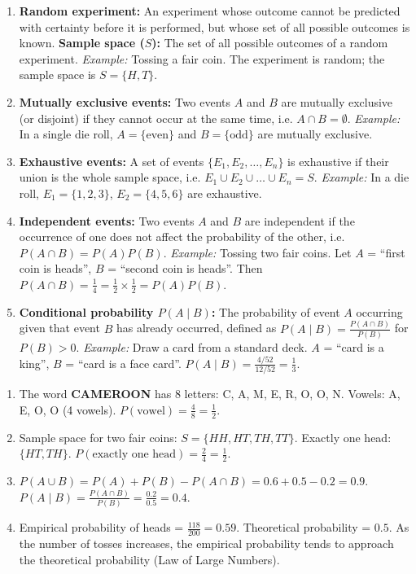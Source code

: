 \documentclass[11pt]{article}
\begin{document}
\begin{corrige}
\begin{enumerate}
\item \textbf{Random experiment:} An experiment whose outcome cannot be predicted with certainty before it is performed, but whose set of all possible outcomes is known. \textbf{Sample space ($S$):} The set of all possible outcomes of a random experiment. \emph{Example:} Tossing a fair coin. The experiment is random; the sample space is $S = \{H, T\}$.
\item \textbf{Mutually exclusive events:} Two events $A$ and $B$ are mutually exclusive (or disjoint) if they cannot occur at the same time, i.e. $A \cap B = \emptyset$. \emph{Example:} In a single die roll, $A = \{\text{even}\}$ and $B = \{\text{odd}\}$ are mutually exclusive.
\item \textbf{Exhaustive events:} A set of events $\{E_1, E_2, \dots, E_n\}$ is exhaustive if their union is the whole sample space, i.e. $E_1 \cup E_2 \cup \dots \cup E_n = S$. \emph{Example:} In a die roll, $E_1 = \{1,2,3\}$, $E_2 = \{4,5,6\}$ are exhaustive.
\item \textbf{Independent events:} Two events $A$ and $B$ are independent if the occurrence of one does not affect the probability of the other, i.e. $P(A \cap B) = P(A)P(B)$. \emph{Example:} Tossing two fair coins. Let $A$ = ``first coin is heads'', $B$ = ``second coin is heads''. Then $P(A \cap B) = \frac{1}{4} = \frac{1}{2} \times \frac{1}{2} = P(A)P(B)$.
\item \textbf{Conditional probability $P(A \mid B)$:} The probability of event $A$ occurring given that event $B$ has already occurred, defined as $P(A \mid B) = \frac{P(A \cap B)}{P(B)}$ for $P(B) > 0$. \emph{Example:} Draw a card from a standard deck. $A$ = ``card is a king'', $B$ = ``card is a face card''. $P(A \mid B) = \frac{4/52}{12/52} = \frac{1}{3}$.
\end{enumerate}
\end{corrige}

\begin{corrige}
\begin{enumerate}
\item The word \textbf{CAMEROON} has 8 letters: C, A, M, E, R, O, O, N. Vowels: A, E, O, O (4 vowels). $P(\text{vowel}) = \frac{4}{8} = \frac{1}{2}$.
\item Sample space for two fair coins: $S = \{HH, HT, TH, TT\}$. Exactly one head: $\{HT, TH\}$. $P(\text{exactly one head}) = \frac{2}{4} = \frac{1}{2}$.
\item $P(A \cup B) = P(A) + P(B) - P(A \cap B) = 0.6 + 0.5 - 0.2 = 0.9$. $P(A \mid B) = \frac{P(A \cap B)}{P(B)} = \frac{0.2}{0.5} = 0.4$.
\item Empirical probability of heads = $\frac{118}{200} = 0.59$. Theoretical probability = $0.5$. As the number of tosses increases, the empirical probability tends to approach the theoretical probability (Law of Large Numbers).
\end{enumerate}
\end{corrige}
\end{document}
